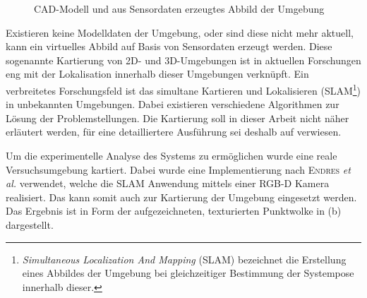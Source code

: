 
\begin{figure}[ht]
	\begin{center}
		\hspace{5mm}
		\caption{CAD-Modell und aus Sensordaten erzeugtes Abbild der Umgebung}
		\label{fig.mapCADSLAM}
	\end{center}
\end{figure}

Existieren keine Modelldaten der Umgebung, oder sind diese nicht mehr aktuell, kann ein virtuelles Abbild auf Basis von Sensordaten erzeugt werden. Diese sogenannte Kartierung von 2D- und 3D-Umgebungen ist in aktuellen Forschungen eng mit der Lokalisation innerhalb dieser Umgebungen verknüpft. Ein verbreitetes Forschungsfeld ist das simultane Kartieren und Lokalisieren (SLAM\footnote{\textit{Simultaneous Localization And Mapping} (SLAM) bezeichnet die Erstellung eines Abbildes der Umgebung bei gleichzeitiger Bestimmung der Systempose innerhalb dieser.}) in unbekannten Umgebungen. Dabei existieren verschiedene Algorithmen zur Lösung der Problemstellungen. Die Kartierung soll in dieser Arbeit nicht näher erläutert werden, für eine detailliertere Ausführung sei deshalb auf \cite{Durrant2006} verwiesen.


Um die experimentelle Analyse des Systems zu ermöglichen wurde eine reale Versuchsumgebung kartiert. Dabei wurde eine Implementierung \cite{Rgbdslam} nach \textsc{Endres} \textit{et al.} \cite{Endres2014} verwendet, welche die SLAM Anwendung mittels einer RGB-D Kamera realisiert. Das \kps{} kann somit auch zur Kartierung der Umgebung eingesetzt werden. Das Ergebnis ist in Form der aufgezeichneten, texturierten Punktwolke in  (b) dargestellt.\\


